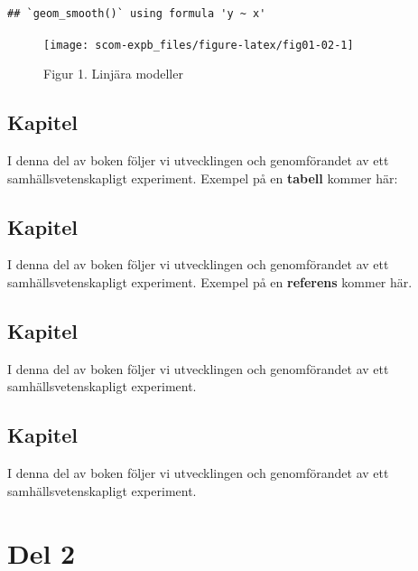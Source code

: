 \documentclass[
]{book}
\begin{document}
\begin{verbatim}
## `geom_smooth()` using formula 'y ~ x'
\end{verbatim}

\begin{figure}

{\centering \texttt{[image: scom-expb\_files/figure-latex/fig01-02-1]} 

}

\caption{Figur 1. Linjära modeller}\label{fig:fig01-02}
\end{figure}

\hypertarget{chap02}{%
\chapter{Kapitel}\label{chap02}}

I denna del av boken följer vi utvecklingen och genomförandet av ett samhällsvetenskapligt experiment. Exempel på en \textbf{tabell} kommer här:

\hypertarget{chap03}{%
\chapter{Kapitel}\label{chap03}}

I denna del av boken följer vi utvecklingen och genomförandet av ett samhällsvetenskapligt experiment. Exempel på en \textbf{referens} \citep{xie2015} kommer här.

\hypertarget{chap04}{%
\chapter{Kapitel}\label{chap04}}

I denna del av boken följer vi utvecklingen och genomförandet av ett samhällsvetenskapligt experiment.

\hypertarget{chap05}{%
\chapter{Kapitel}\label{chap05}}

I denna del av boken följer vi utvecklingen och genomförandet av ett samhällsvetenskapligt experiment.

\newpage

\hypertarget{part-del-2}{%
\part{Del 2}\label{part-del-2}}
\end{document}
